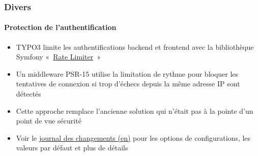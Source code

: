 %

\begin{frame}[fragile]
	\frametitle{Divers}
	\framesubtitle{Protection de l'authentification}

	\begin{itemize}
		\item TYPO3 limite les authentifications backend et frontend avec la bibliothèque Symfony
			«~\href{https://symfony.com/doc/current/rate_limiter.html}{Rate Limiter}~»
		\item Un middleware PSR-15 utilise la limitation de rythme pour bloquer les tentatives de connexion
			si trop d'échecs depuis la même adresse IP sont détectés
		\item Cette approche remplace l'ancienne solution qui n'était pas à la pointe d'un point de vue sécurité
		\item Voir le
			\href{https://docs.typo3.org/c/typo3/cms-core/master/en-us/Changelog/11.3/Feature-93825-IntroduceRateLimiterComponent.html}{journal des changements (en)}
			pour les options de configurations, les valeurs par défaut et plus de détails
	\end{itemize}
\end{frame}

